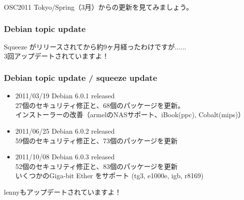 
\begin{frame}
\begin{center}
\LARGE{OSC2011 Tokyo/Spring（3月）からの更新を見てみましょう。}
\end{center}
\end{frame}

\begin{frame}
 \frametitle{Debian topic update}
\begin{center}
\LARGE{Squeeze がリリースされてから約9ヶ月経ったわけですが......}\\\pause
\LARGE{3回アップデートされていますよ！}
\end{center}
\end{frame}

\begin{frame}
 \frametitle{Debian topic update / squeeze update}
\begin{itemize}[<+->]

\item 2011/03/19 Debian 6.0.1 released\\
27個のセキュリティ修正と、68個のパッケージを更新。\\
インストーラーの改善（armelのNASサポート、iBook(ppc), Cobalt(mips)）

\item 2011/06/25 Debian 6.0.2 released\\
59個のセキュリティ修正と、73個のパッケージを更新

\item 2011/10/08 Debian 6.0.3 released\\
52個のセキュリティ修正と、83個のパッケージを更新\\
いくつかのGiga-bit Ether をサポート (tg3, e1000e, igb, r8169)\\

\end{itemize}


\end{frame}

\begin{frame}
\begin{center}
\LARGE{lennyもアップデートされていますよ！}
\end{center}
\end{frame}


